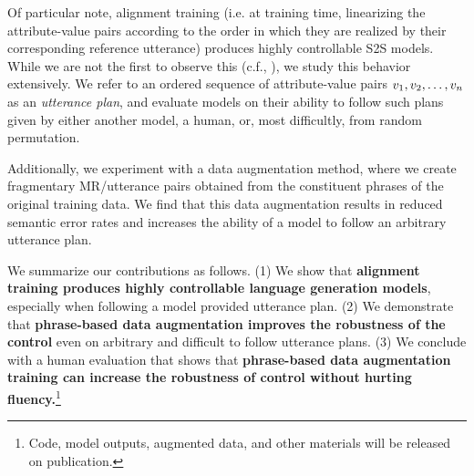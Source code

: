 Of particular note, alignment training (i.e.  at training time, linearizing
the attribute-value pairs according to the order in which they are realized by
their corresponding reference utterance) produces highly controllable  S2S
models.  While we are not the first to observe this (c.f., \citet{nayak2017}),
we study this behavior extensively.  We refer to an ordered sequence of
attribute-value pairs $v_1, v_2, \ldots, v_n$ as an
\textit{utterance plan}, and evaluate models on their ability to follow such
plans given by either another model, a human, or, most difficultly, from
random permutation.

Additionally, we experiment with a data augmentation method, where we create
fragmentary MR/utterance pairs obtained from the constituent phrases of the
original training data.  We find that this data augmentation results in
reduced semantic error rates and increases the ability of a model to follow an
arbitrary utterance plan.

 We summarize our contributions as follows. (1) We show that \textbf{alignment training
produces highly controllable %
language generation models},
especially when following a model provided utterance plan. (2) We demonstrate that \textbf{phrase-based
data augmentation improves the robustness of the control} even on arbitrary
and difficult to follow utterance plans. (3) We conclude with a human
evaluation that shows that \textbf{phrase-based data augmentation training
can increase the robustness of control without hurting fluency.}\footnote{
    Code, model outputs, augmented data, and other materials will be 
released on publication.}


